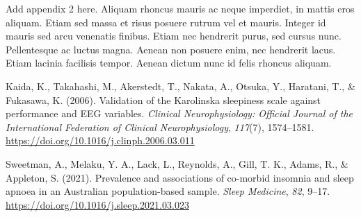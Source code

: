 \documentclass[12pt,a4paper,]{report}
\newlength{\cslhangindent}
\newenvironment{CSLReferences}[2] %
 {%
  \setlength{\parindent}{0pt}
  \ifodd #1 \everypar{\setlength{\hangindent}{\cslhangindent}}\ignorespaces\fi
  \ifnum #2 > 0
  \setlength{\parskip}{#2\baselineskip}
  \fi
 }%
 {}
\begin{document}
Add appendix 2 here. Aliquam rhoncus mauris ac neque imperdiet, in
mattis eros aliquam. Etiam sed massa et risus posuere rutrum vel et
mauris. Integer id mauris sed arcu venenatis finibus. Etiam nec
hendrerit purus, sed cursus nunc. Pellentesque ac luctus magna. Aenean
non posuere enim, nec hendrerit lacus. Etiam lacinia facilisis tempor.
Aenean dictum nunc id felis rhoncus aliquam.

\newpage

\label{refs}
\begin{CSLReferences}{1}{0}
Kaida, K., Takahashi, M., Akerstedt, T., Nakata, A., Otsuka, Y.,
Haratani, T., \& Fukasawa, K. (2006). Validation of the {Karolinska}
sleepiness scale against performance and {EEG} variables. \emph{Clinical
Neurophysiology: Official Journal of the International Federation of
Clinical Neurophysiology}, \emph{117}(7), 1574--1581.
\url{https://doi.org/10.1016/j.clinph.2006.03.011}

Sweetman, A., Melaku, Y. A., Lack, L., Reynolds, A., Gill, T. K., Adams,
R., \& Appleton, S. (2021). Prevalence and associations of co-morbid
insomnia and sleep apnoea in an {Australian} population-based sample.
\emph{Sleep Medicine}, \emph{82}, 9--17.
\url{https://doi.org/10.1016/j.sleep.2021.03.023}

\end{CSLReferences}
\end{document}
